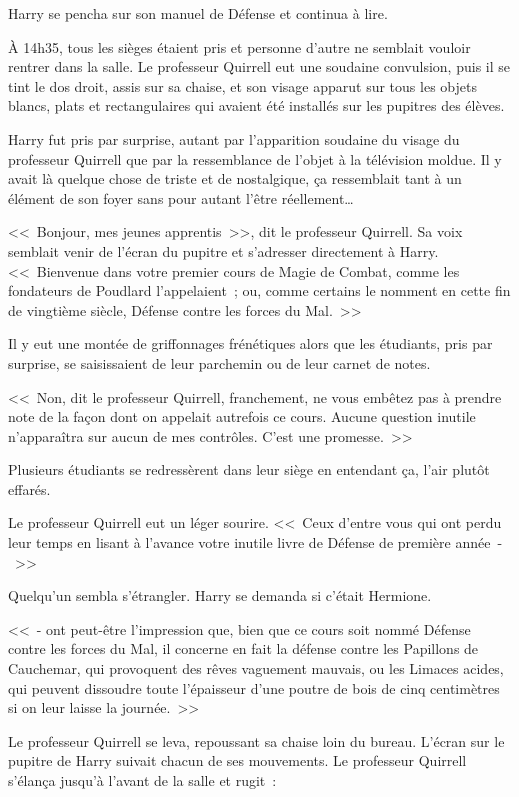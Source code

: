 Harry se pencha sur son manuel de Défense et continua à lire.

\later

À 14h35, tous les sièges étaient pris et personne d'autre ne semblait vouloir rentrer dans la salle. Le professeur Quirrell eut une soudaine convulsion, puis il se tint le dos droit, assis sur sa chaise, et son visage apparut sur tous les objets blancs, plats et rectangulaires qui avaient été installés sur les pupitres des élèves.

Harry fut pris par surprise, autant par l'apparition soudaine du visage du professeur Quirrell que par la ressemblance de l'objet à la télévision moldue. Il y avait là quelque chose de triste et de nostalgique, ça ressemblait tant à un élément de son foyer sans pour autant l'être réellement…

<<~Bonjour, mes jeunes apprentis~>>, dit le professeur Quirrell. Sa voix semblait venir de l'écran du pupitre et s'adresser directement à Harry. <<~Bienvenue dans votre premier cours de Magie de Combat, comme les fondateurs de Poudlard l'appelaient~; ou, comme certains le nomment en cette fin de vingtième siècle, Défense contre les forces du Mal.~>>

Il y eut une montée de griffonnages frénétiques alors que les étudiants, pris par surprise, se saisissaient de leur parchemin ou de leur carnet de notes.

<<~Non, dit le professeur Quirrell, franchement, ne vous embêtez pas à prendre note de la façon dont on appelait autrefois ce cours. Aucune question inutile n'apparaîtra sur aucun de mes contrôles. C'est une promesse.~>>

Plusieurs étudiants se redressèrent dans leur siège en entendant ça, l'air plutôt effarés.

Le professeur Quirrell eut un léger sourire. <<~Ceux d'entre vous qui ont perdu leur temps en lisant à l'avance votre inutile livre de Défense de première année~-~>>

Quelqu'un sembla s'étrangler. Harry se demanda si c'était Hermione.

<<~- ont peut-être l'impression que, bien que ce cours soit nommé Défense contre les forces du Mal, il concerne en fait la défense contre les Papillons de Cauchemar, qui provoquent des rêves vaguement mauvais, ou les Limaces acides, qui peuvent dissoudre toute l'épaisseur d'une poutre de bois de cinq centimètres si on leur laisse la journée.~>>

Le professeur Quirrell se leva, repoussant sa chaise loin du bureau. L'écran sur le pupitre de Harry suivait chacun de ses mouvements. Le professeur Quirrell s'élança jusqu'à l'avant de la salle et rugit~:

